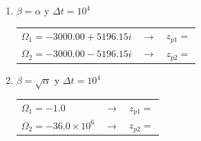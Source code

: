 \begin{enumerate}[label=(\alph*)]

\item $\beta = \alpha$ y $\Delta t = 10^4$
\begin{center}
\begin{tabular}{lll}
$\Omega_1 = −3000.00 + 5196.15i$ & $\rightarrow$ & $z_{p1} = $ \\
$\Omega_2 = −3000.00 - 5196.15i$ & $\rightarrow$ & $z_{p2} = $
\end{tabular}
\end{center}

\item $\beta = \sqrt{\alpha}$ y $\Delta t = 10^4$
\begin{center}
\begin{tabular}{lll}
$\Omega_1 = -1.0$ & $\rightarrow$ & $z_{p1} = $ \\
$\Omega_2 = -36.0 \times 10^6$ & $\rightarrow$ & $z_{p2} = $
\end{tabular}
\end{center}

\end{enumerate}




